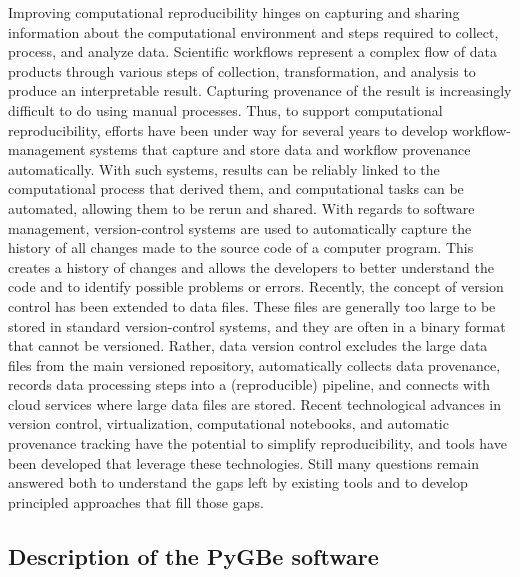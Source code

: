 Improving computational reproducibility hinges on capturing and sharing information about the computational environment and steps required to collect, process, and analyze data.
Scientific workflows represent a complex flow of data products through various steps of collection, transformation, and analysis to produce an interpretable result. 
Capturing provenance of the result is increasingly difficult to do using manual processes. 
Thus, to support computational reproducibility, efforts have been under way for several years to develop workflow-management systems that capture and store data and workflow provenance automatically. 
With such systems, results can be reliably linked to the computational process that derived them, and computational tasks can be automated, allowing them to be rerun and shared.
With regards to software management, version-control systems are used to automatically capture the history of all changes made to the source code of a computer program. 
This creates a history of changes and allows the developers to better understand the code and to identify possible problems or errors.
Recently, the concept of version control has been extended to data files. 
These files are generally too large to be stored in standard version-control systems, and they are often in a binary format that cannot be versioned. 
Rather, data version control excludes the large data files from the main versioned repository, automatically collects data provenance, records data processing steps into a (reproducible) pipeline, and connects with cloud services where large data files are stored.
Recent technological advances in version control, virtualization, computational notebooks, and automatic provenance tracking have the potential to simplify reproducibility, and tools have been developed that leverage these technologies.
Still many questions remain answered both to understand the gaps left by existing tools and to develop principled approaches that fill those gaps. 



\subsection{Description of the PyGBe software}


